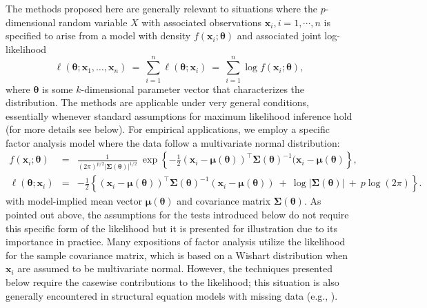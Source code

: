 \documentclass[man]{apa}
\begin{document}
The methods proposed here are generally relevant to situations where the
$p$-dimensional random variable $X$ with associated observations $\bm{x}_i, i=1,\cdots,n$
is specified to arise from a model with density $f(\bm{x}_i; \bm{\theta})$ and
associated joint log-likelihood
\begin{equation} \label{eq:loglik}
  \ell(\bm{\theta}; \bm{x}_1, \dots, \bm{x}_n) ~=~
    \sum_{i = 1}^n \ell(\bm{\theta}; \bm{x}_i) ~=~
    \sum_{i = 1}^n  \log f(\bm{x}_i; \bm{\theta}),
\end{equation}
where ${\bm \theta}$ is some $k$-dimensional parameter vector that characterizes
the distribution. 
The methods are applicable under very general conditions, essentially
whenever standard assumptions for maximum likelihood inference hold (for more
details see below). For empirical applications, we employ
a specific factor analysis model where the data follow a multivariate normal
distribution:
\begin{eqnarray}
    \label{eq:mvndensity}
    f(\bm{x}_i; \bm{\theta}) & = & \frac{1}{(2\pi)^{p/2} |
      \bm{\Sigma}(\bm{\theta}) |^{1/2}} ~ \exp \left\{ -\frac{1}{2}(\bm{x}_i -
    \bm{\mu}(\bm{\theta}))^{\top} \bm{\Sigma}(\bm{\theta})^{-1} (\bm{x}_i -
    \bm{\mu}(\bm{\theta}) \right\}, \\
    \label{eq:caselik}
    \ell(\bm{\theta}; \bm{x}_i) & = & -\frac{1}{2} \left\{
      (\bm{x}_i - \bm{\mu}(\bm{\theta}))^{\top} \bm{\Sigma}(\bm{\theta})^{-1} (\bm{x}_i - \bm{\mu}(\bm{\theta}))
      ~+~ \log | \bm{\Sigma}(\bm{\theta}) | ~+~ p \log(2 \pi) \right\}.
\end{eqnarray}
with model-implied mean vector ${\bm{\mu}}({\bm{\theta}})$ and
covariance matrix ${\bm{\Sigma}}({\bm{\theta}})$. As pointed out above,
the assumptions for the tests introduced below do not require this specific
form of the likelihood but it is presented for illustration due to
its importance in practice.  Many expositions of factor analysis
utilize the likelihood for the sample covariance matrix, which is
based on a Wishart distribution when $\bm{x}_i$ are assumed to be
multivariate normal.
However, the techniques presented below require the casewise contributions
to the likelihood; this situation is also generally
encountered in structural equation models with missing data (e.g.,
).
\end{document}
